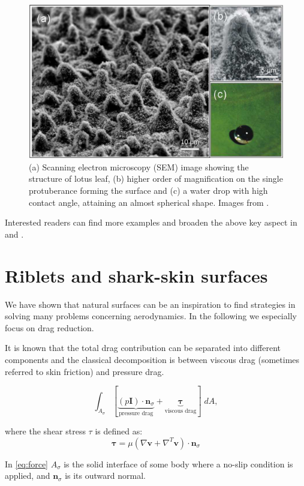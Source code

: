 \begin{figure}[h]
	\centering
	\includegraphics[width=0.6\linewidth]{chapter_1/lotus}
	\caption{(a) Scanning electron microscopy (SEM) image showing the structure of lotus leaf, (b) higher order of magnification on the single protuberance forming the surface and (c) a water drop with high contact angle, attaining an almost spherical shape. Images from \citet{stratakis2009laser}.}
	\label{fig:lotus}
\end{figure}

Interested readers can find more examples and broaden the above key aspect in \citet{bhushan2016biomimetics} and \citet{tropea2012nature}.

\section{Riblets and shark-skin surfaces}
We have shown that natural surfaces can be an inspiration to find strategies in solving many problems concerning aerodynamics. In the following we especially focus on drag reduction.

It is known that the total drag contribution can be separated into different components and the classical decomposition is between viscous drag (sometimes referred to skin friction) and pressure drag.

\begin{equation}
 \int_{A_{\sigma}}  [ \underbrace{\left({p} \mathbf{I} \right) \cdot  \mathbf{n}_{\sigma} }_\text{pressure drag}  +  \underbrace{\boldsymbol{\tau}}_\text{viscous drag} ] \; dA,
 \label{eq:force}
\end{equation}

where the shear stress $\tau$ is defined as:
$$
\boldsymbol{\tau} = \mu \left( \nabla \mathbf{v} +  \nabla^T \mathbf{v} \right) \cdot  \mathbf{n}_{\sigma}
$$

In \eqref{eq:force} $A_{\sigma}$ is the solid interface of some body where a no-slip condition is applied, and $ \mathbf{n}_{\sigma}$ is its outward normal.

